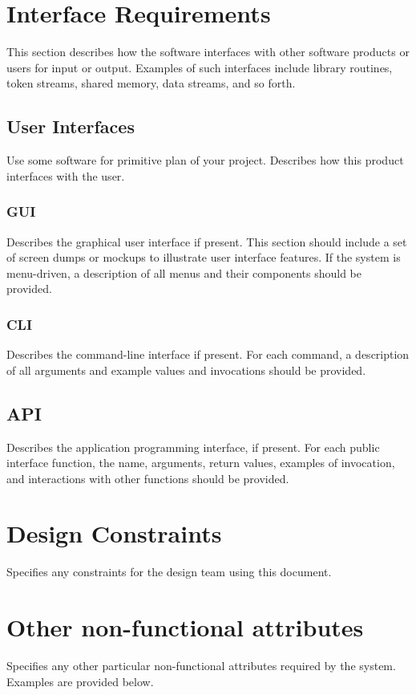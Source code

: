 \documentclass[]{article}
\begin{document}
\section{Interface Requirements}
This section describes how the software interfaces with other software products or users for input or output. Examples of such interfaces include library routines, token streams, shared memory, data streams, and so forth. 

\subsection{User Interfaces}
Use some software for primitive plan of your project.
Describes how this product interfaces with the user. 

\subsubsection {GUI}
Describes the graphical user interface if present. This section should include a set of screen dumps or mockups to illustrate user interface features. 
If the system is menu-driven, a description of all menus and their components should be provided. 

\subsubsection { CLI}
Describes the command-line interface if present. For each command, a description of all arguments and example values and invocations should be provided. 

\subsection {API}
Describes the application programming interface, if present. For each public interface function, the name, arguments, return values, examples of invocation, and interactions with other functions should be provided. 

\section{Design Constraints}
Specifies any constraints for the design team using this document. 

\section{Other non-functional attributes}
Specifies any other particular non-functional attributes required by the system. Examples are provided below. 
\end{document}
